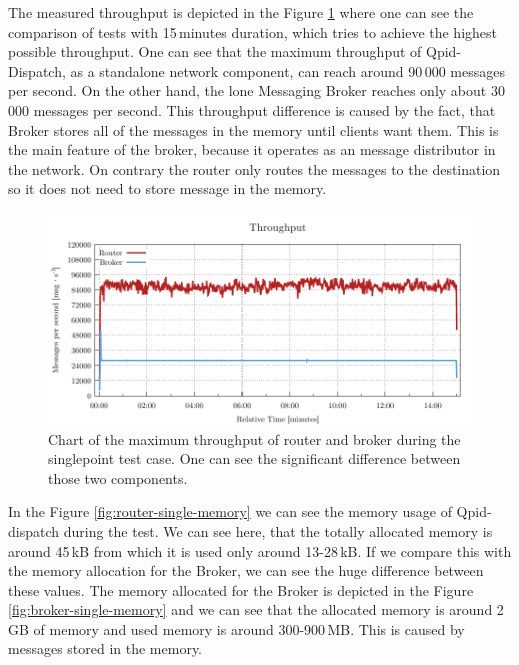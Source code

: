 The measured throughput is depicted in the Figure \ref{fig:rate-single} where one can see the comparison of tests with 15\,minutes duration, which tries to achieve the highest possible throughput. One can see that the maximum throughput of Qpid-Dispatch, as a standalone network component, can reach around 90\,000 messages per second. On the other hand, the lone Messaging Broker reaches only about 30\,000 messages per second. This throughput difference is caused by the fact, that Broker stores all of the messages in the memory until clients want them. This is the main feature of the broker, because it operates as an message distributor in the network. On contrary the router only routes the messages to the destination so it does not need to store message in the memory.

\begin{figure}[H]
	\centering
	\includegraphics[width=1\linewidth]{obrazky-figures/charts/singlepoint-throughput.pdf}
	\caption{Chart of the maximum throughput of router and broker during the singlepoint test case. One can see the significant difference between those two components.}
	\label{fig:rate-single}
\end{figure}

In the Figure \ref{fig:router-single-memory} we can see the memory usage of Qpid-dispatch during the test. We can see here, that the totally allocated memory is around 45\,kB from which it is used only around 13-28\,kB. If we compare this with the memory allocation for the Broker, we can see the huge difference between these values. The memory allocated for the Broker is depicted in the Figure \ref{fig:broker-single-memory} and we can see that the allocated memory is around 2\,GB of memory and used memory is around 300-900\,MB. This is caused by messages stored in the memory.

